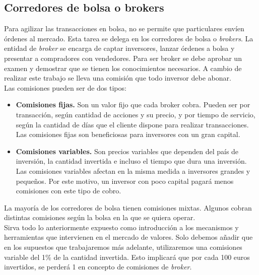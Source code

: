 		\subsection{Corredores de bolsa o brokers}
	
		Para agilizar las transacciones en bolsa, no se permite que particulares env\'ien \'ordenes al mercado. Esta tarea se delega en los corredores de bolsa o \textit{brokers}. La entidad de \textit{broker} se encarga de captar inversores, lanzar \'ordenes a bolsa y presentar a compradores con vendedores. Para ser broker se debe aprobar un examen y demostrar que se tienen los conocimientos necesarios. A cambio de realizar este trabajo se lleva una comisi\'on que todo inversor debe abonar. \\
		
		Las comisiones pueden ser de dos tipos:\\
		
		\begin{itemize}
			\item \textbf{Comisiones fijas.} Son un valor fijo que cada broker cobra. Pueden ser por transacci\'on, seg\'un cantidad de acciones y su precio, y por tiempo de servicio, seg\'un la cantidad de d\'ias que el cliente dispone para realizar transacciones. Las comisiones fijas son beneficiosas para inversores con un gran capital.
			
			\item \textbf{Comisiones variables.} Son precios variables que dependen del país de inversión, la cantidad invertida e incluso el tiempo que dura una inversi\'on. Las comisiones variables afectan en la misma medida a inversores grandes y peque\~nos. Por este motivo, un inversor con poco capital pagar\'a menos comisiones con este tipo de cobro.
		\end{itemize}
		
		La mayor\'ia de los corredores de bolsa tienen comisiones mixtas. Algunos cobran distintas comisiones seg\'un la bolsa en la que se quiera operar. \\
		
		Sirva todo lo anteriormente expuesto como introducci\'on a los mecanismos y herramientas que intervienen en el mercado de valores. Solo debemos a\~nadir que en los supuestos que trabajaremos m\'as adelante, utilizaremos una comisiones variable del 1\% de la cantidad invertida. Esto implicar\'a que por cada 100 euros invertidos, se perder\'a 1 en concepto de comisiones de \textit{broker}.\\
